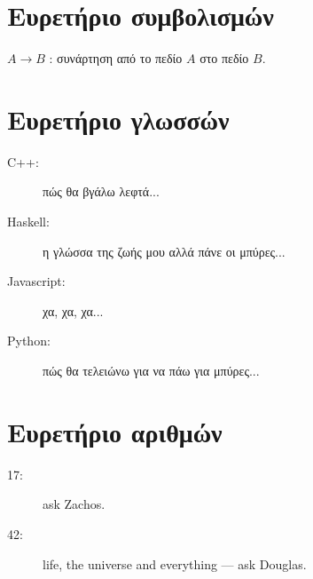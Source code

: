 \documentclass[diploma]{softlab-thesis}
\begin{document}





\backmatter

\appendix

\chapter{Ευρετήριο συμβολισμών}

$A \rightarrow B$ : συνάρτηση από το πεδίο $A$ στο πεδίο $B$.

\chapter{Ευρετήριο γλωσσών}

\begin{description}
\item[C++:] πώς θα βγάλω λεφτά...
\item[Haskell:] η γλώσσα της ζωής μου αλλά πάνε οι μπύρες...
\item[Javascript:] χα, χα, χα...
\item[Python:] πώς θα τελειώνω για να πάω για μπύρες...
\end{description}


\chapter{Ευρετήριο αριθμών}

\begin{description}
\item[17:] ask Zachos.
\item[42:] life, the universe and everything --- ask Douglas.
\end{description}


\end{document}
